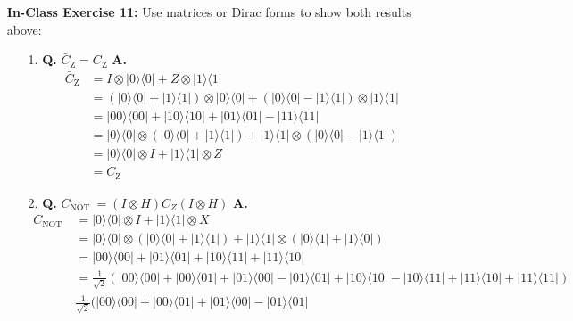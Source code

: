 \documentclass[main.tex]{subfiles}
\begin{document}
\begin{enumerate}
\item[] \textbf{In-Class Exercise 11:} Use matrices or Dirac forms to show both results above:
\begin{enumerate}
    \item [1.] \textbf{Q.} $\bar{C}_{\mathrm{Z}}=C_{\mathrm{Z}}$ \textbf{A.}
    \begin{align*}
        \bar{C}_{\mathrm{Z}}    & = I \otimes|0\rangle\langle 0|+Z \otimes |1\rangle\langle 1|\\
                                & = (|0\rangle\langle0|+|1\rangle\langle1|)\otimes|0\rangle\langle 0| +
                                (|0\rangle\langle0|-|1\rangle\langle1|)\otimes|1\rangle\langle 1|\\
                                & = |00\rangle\langle00|+|10\rangle\langle10|+|01\rangle\langle01|-|11\rangle\langle11|\\
                                & = |0\rangle\langle 0| \otimes (|0\rangle\langle0|+|1\rangle\langle1|) +
                                |1\rangle\langle 1| \otimes (|0\rangle\langle0|-|1\rangle\langle1|)\\
                                & = |0\rangle\langle 0|\otimes I+| 1\rangle\langle 1| \otimes Z\\
                                & = C_{\mathrm{Z}}
    \end{align*}
    \item [2.] \textbf{Q.} $C_{\text {NOT }}=(I \otimes H) C_{Z}(I \otimes H)$ \textbf{A.}
    \begin{align*}
        C_{\text {NOT }}    & = |0\rangle\langle 0|\otimes I+| 1\rangle\langle 1| \otimes X\\
                            & = |0\rangle\langle 0|\otimes (|0\rangle\langle0|+|1\rangle\langle1|)
                            + |1\rangle\langle 1| \otimes (|0\rangle\langle1|+|1\rangle\langle0|)\\
                            & = |00\rangle\langle00|+|01\rangle\langle01| + |10\rangle\langle11|+|11\rangle\langle10|\\
                            & = \frac{1}{\sqrt{2}}(
                            |00\rangle\langle00|+|00\rangle\langle01|+|01\rangle\langle00|-|01\rangle\langle01|
                            +|10\rangle\langle10|-|10\rangle\langle11|+|11\rangle\langle10|+|11\rangle\langle11|)\\
                            & \frac{1}{\sqrt{2}}(
                            |00\rangle\langle00|+|00\rangle\langle01|+|01\rangle\langle00|-|01\rangle\langle01|

\end{align*}
\end{enumerate}
\end{enumerate}
\end{document}
